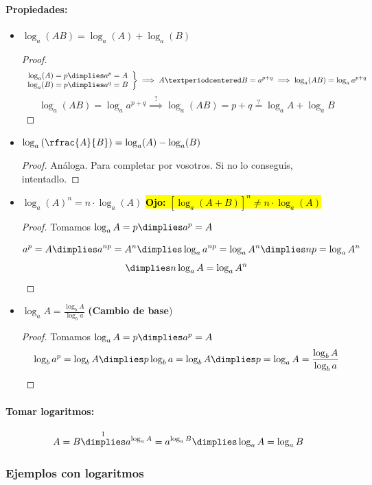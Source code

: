 \documentclass[palatino,nosec]{Docencia}
\begin{document}
\paragraph{Propiedades:}
\begin{itemize}
	\item $\log_a(AB) = \log_a(A) + \log_a(B)$
		\begin{proof}
			\[\left.\begin{array}{c}
				\log_a(A) = p \dimplies a^p = A\\
				\log_a(B) = p \dimplies a^q = B
			\end{array}\right\}\implies A·B = a^{p+q} \implies \log_a(AB) = \log_aa^{p+q}\]
			\[
				\log_a(AB) = \log_aa^{p+q} \overset{?}{\implies} \log_a(AB) = p+q \overset{?}{=} \log_aA + \log_aB
			\]
		\end{proof}
	\item $\log_a\left(\rfrac{A}{B}\right) = \log_a(A) - \log_a(B)$
	\begin{proof}
		Análoga. Para completar por vosotros. Si no lo conseguís, intentadlo.
	\end{proof}
	\item $\log_a(A)^n = n·\log_a(A)$ \hl{\textbf{Ojo:} $\left[\log_a(A+B)\right]^n \neq n·\log_a(A)$}
	\begin{proof}
		Tomamos $\log_aA = p \dimplies a^p = A$

		\[
			a^p = A \dimplies a^{np}=A^n \dimplies \log_aa^{np} = \log_aA^n \dimplies np = \log_aA^n
		\]
		\[ 
			\dimplies n\log_aA = \log_aA^n
		\]
	\end{proof}
	\item $\displaystyle\log_aA = \frac{\log_bA}{\log_ba}$ \textbf{(Cambio de base})
		\begin{proof}
			Tomamos $\log_aA = p \dimplies a^p = A$
			\[
				\log_ba^p = \log_bA \dimplies p\log_ba = \log_bA \dimplies p=\log_aA=\frac{\log_bA}{\log_ba}
			\]

		\end{proof}
\end{itemize}

\paragraph{Tomar logaritmos:}

\[
A = B \overset{1}{\dimplies} a^{\log_a A} = a^{\log_a B} \dimplies \log_aA=\log_aB
\]

\subsubsection{Ejemplos con logaritmos}
\end{document}
